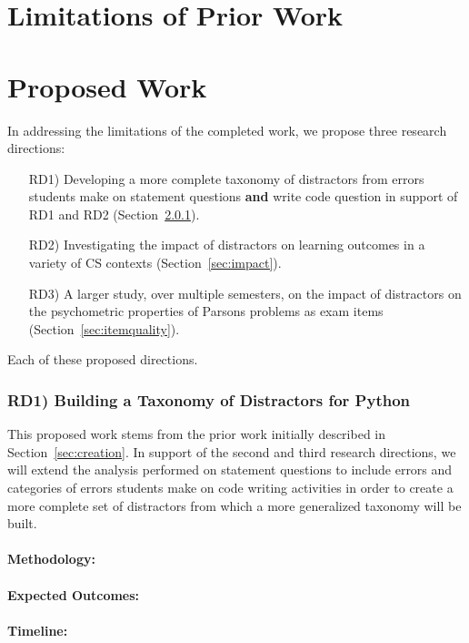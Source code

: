 \documentclass[]{acmart}
\begin{document}
\section{Limitations of Prior Work}

\section{Proposed Work}

In addressing the limitations of the completed work, we propose three research
directions:
\begin{enumerate}
  \item[RD1)] Developing a more complete taxonomy of distractors from errors
    students make on statement questions \textbf{and} write code question in support of
    RD1 and RD2 (Section~\ref{sec:taxonomy}).
  \item[RD2)] Investigating the impact of distractors on learning outcomes in a
    variety of CS contexts (Section~\ref{sec:impact}).
  \item[RD3)] A larger study, over multiple semesters, on the impact of distractors on the psychometric
    properties of Parsons problems as exam items (Section~\ref{sec:itemquality}).
\end{enumerate}
Each of these proposed directions. 

\subsubsection{RD1) Building a Taxonomy of Distractors for Python}\label{sec:taxonomy}

This proposed work stems from the prior work initially described in
Section~\ref{sec:creation}. In support of the second and third research
directions, we will extend the analysis performed on statement questions to
include errors and categories of errors students make on code writing activities
in order to create a more complete set of distractors from which a more
generalized taxonomy will be built. 

\paragraph{Methodology:}

\paragraph{Expected Outcomes:}

\paragraph{Timeline:}
\end{document}
